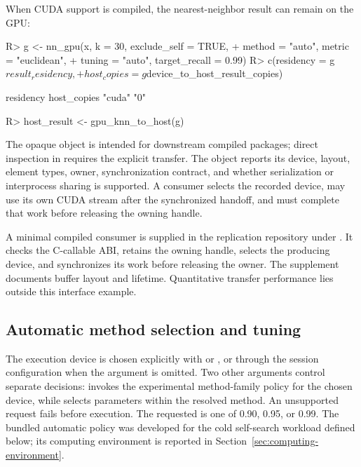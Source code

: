 \documentclass[article]{jss}
\begin{document}
When CUDA support is compiled, the nearest-neighbor result can remain on the
GPU:
\begin{CodeChunk}
\begin{CodeInput}
R> g <- nn_gpu(x, k = 30, exclude_self = TRUE,
+            method = "auto", metric = "euclidean",
+            tuning = "auto", target_recall = 0.99)
R> c(residency = g$result_residency,
+    host_copies = g$device_to_host_result_copies)
\end{CodeInput}
\begin{CodeOutput}
   residency host_copies
      "cuda"         "0"
\end{CodeOutput}
\begin{CodeInput}
R> host_result <- gpu_knn_to_host(g)
\end{CodeInput}
\end{CodeChunk}
The opaque object is intended for downstream compiled packages; direct
inspection in  requires the explicit transfer. The object reports
its device, layout, element types, owner, synchronization contract, and whether
serialization or interprocess sharing is supported. A consumer selects the
recorded device, may use its own CUDA stream after the synchronized handoff,
and must complete that work before releasing the owning handle.

A minimal compiled consumer is supplied in the replication repository under
.
It checks the C-callable ABI, retains the owning handle, selects the producing
device, and synchronizes its work before releasing the owner. The supplement
documents buffer layout and lifetime. Quantitative transfer performance lies
outside this interface example.

\subsection{Automatic method selection and tuning} \label{sec:tuning}

The execution device is chosen explicitly with  or
, or through the session configuration when the
argument is omitted. Two other arguments control separate decisions:
 invokes the experimental method-family policy for the
chosen device, while  selects parameters within the
resolved method. An unsupported request fails before execution.
The requested  is one of 0.90, 0.95, or 0.99.
The bundled automatic policy was developed for the cold self-search workload
defined below; its computing environment is reported in
Section~\ref{sec:computing-environment}.
\end{document}
